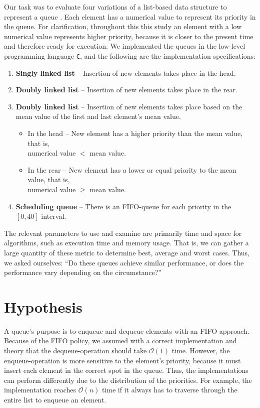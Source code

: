 \documentclass[a4paper,11pt]{kth-mag}
\newcommand*{\skippara}{\par\vspace{\baselineskip} \noindent}
\begin{document}
\skippara Our task was to evaluate four variations of a list-based data structure to represent a queue \cite{Uppgiftl9:online}.
Each element has a numerical value to represent its priority in the queue.
For clarification, throughout this this study an element with a low numerical value represents higher priority, because it is closer to the present time and therefore ready for execution.
We implemented the queues in the low-level programming language \texttt{C}, and the following are the implementation specifications:
\begin{enumerate}
    \item \textbf{Singly linked list} -- Insertion of new elements takes place in the head.
    \item \textbf{Doubly linked list} -- Insertion of new elements takes place in the rear.
        \item \textbf{Doubly linked list} -- Insertion of new elements takes place based on the mean value of the first and last element's mean value.
        \begin{itemize}
            \item In the head -- New element has a higher priority than the mean value, that is, \\numerical value $<$ mean value.
            \item In the rear -- New element has a lower or equal priority to the mean value, that is,\\numerical value $\ge$ mean value.
        \end{itemize}
    \item \textbf{Scheduling queue} -- There is an FIFO-queue for each priority in the $[0,40]$ interval.
\end{enumerate}


\skippara The relevant parameters to use and examine are primarily time and space for algorithms, such as execution time and memory usage.
That is, we can gather a large quantity of these metric to determine best, average and worst cases.
Thus, we asked ourselves: ``Do these queues achieve similar performance, or does the performance vary depending on the circumstance?''


\clearpage
\section{Hypothesis}
A queue's purpose is to enqueue and dequeue elements with an FIFO approach.
Because of the FIFO policy, we assumed with a correct implementation and theory that the dequeue-operation should take $\mathcal{O}(1)$ time.
However, the enqueue-operation is more sensitive to the element's priority, because it must insert each element in the correct spot in the queue.
Thus, the implementations can perform differently due to the distribution of the priorities.
For example, the implementation reaches $\mathcal{O}(n)$ time if it always has to traverse through the entire list to enqueue an element.
\end{document}
